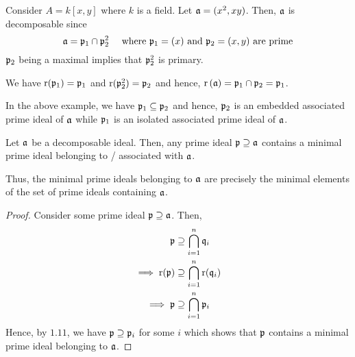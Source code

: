\begin{example}{}{}
	Consider \(A = k[x, y]\) where \(k\) is a field.
	Let \(\mathfrak{a} = (x^2, xy)\).
	Then, \(\mathfrak{a}\) is decomposable since
	\[
		\mathfrak{a} = \mathfrak{p}_1 \cap \mathfrak{p}_2^2
		\quad \text{ where } \mathfrak{p}_1 = (x) \text{ and } \mathfrak{p}_2 = (x, y)
		\text{ are prime}
	\]
	\(\mathfrak{p}_2\) being a maximal implies that \(\mathfrak{p}_2^2\) is primary.

	We have \(\operatorname{r}(\mathfrak{p}_1) = \mathfrak{p}_1\) and \(\operatorname{r}(\mathfrak{p}_2^2) = \mathfrak{p}_2\)
	and hence, \(\operatorname{r}\left( \mathfrak{a} \right) = \mathfrak{p}_1 \cap \mathfrak{p}_2 = \mathfrak{p}_1\).
\end{example}

In the above example, we have \(\mathfrak{p}_1 \subseteq \mathfrak{p}_2\) and hence,
\(\mathfrak{p}_2\) is an embedded associated prime ideal of \(\mathfrak{a}\) while
\(\mathfrak{p}_1\) is an isolated associated prime ideal of \(\mathfrak{a}\).


\begin{proposition}{}{}
\label{prop:4_6}
	Let \(\mathfrak{a}\) be a decomposable ideal.
	Then, any prime ideal \(\mathfrak{p} \supseteq \mathfrak{a}\) contains a minimal
	prime ideal belonging to / associated with \(\mathfrak{a}\).

	Thus, the minimal prime ideals belonging to \(\mathfrak{a}\) are precisely
	the minimal elements of the set of prime ideals containing \(\mathfrak{a}\).
\end{proposition}

\begin{proof}
	Consider some prime ideal \(\mathfrak{p} \supseteq \mathfrak{a}\).
	Then,
	\begin{align*}
		\mathfrak{p} &\supseteq \bigcap_{i = 1}^{n} \mathfrak{q}_i \\
		\implies \operatorname{r}(\mathfrak{p}) &\supseteq \bigcap_{i = 1}^{n} \operatorname{r}(\mathfrak{q}_i) \\
		\implies \mathfrak{p} &\supseteq \bigcap_{i = 1}^{n} \mathfrak{p}_i
	\end{align*}
	Hence, by \(1.11\), we have \(\mathfrak{p} \supseteq \mathfrak{p}_i\) for some \(i\)
	which shows that \(\mathfrak{p}\) contains a minimal prime ideal belonging to
	\(\mathfrak{a}\).
\end{proof}



